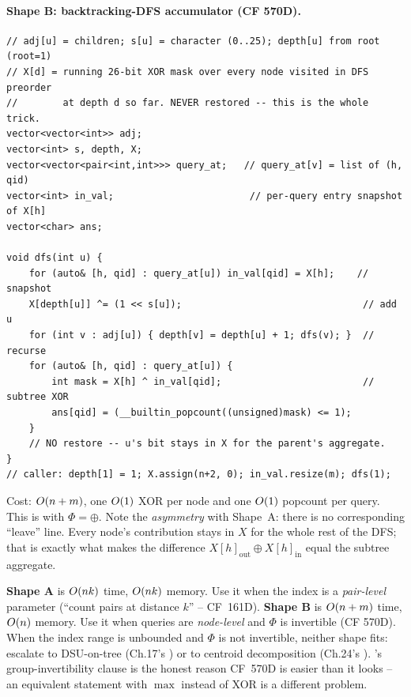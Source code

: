 \paragraph{Shape B: backtracking-DFS accumulator (CF 570D).}

\begin{lstlisting}[caption={Per-depth prefix XOR along the DFS preorder; each query takes an entry snapshot and reads the exit XOR-difference}, label={lst:c10-depth-hist}]
// adj[u] = children; s[u] = character (0..25); depth[u] from root (root=1)
// X[d] = running 26-bit XOR mask over every node visited in DFS preorder
//        at depth d so far. NEVER restored -- this is the whole trick.
vector<vector<int>> adj;
vector<int> s, depth, X;
vector<vector<pair<int,int>>> query_at;   // query_at[v] = list of (h, qid)
vector<int> in_val;                        // per-query entry snapshot of X[h]
vector<char> ans;

void dfs(int u) {
    for (auto& [h, qid] : query_at[u]) in_val[qid] = X[h];    // snapshot
    X[depth[u]] ^= (1 << s[u]);                                // add u
    for (int v : adj[u]) { depth[v] = depth[u] + 1; dfs(v); }  // recurse
    for (auto& [h, qid] : query_at[u]) {
        int mask = X[h] ^ in_val[qid];                         // subtree XOR
        ans[qid] = (__builtin_popcount((unsigned)mask) <= 1);
    }
    // NO restore -- u's bit stays in X for the parent's aggregate.
}
// caller: depth[1] = 1; X.assign(n+2, 0); in_val.resize(m); dfs(1);
\end{lstlisting}

\noindent Cost: $O(n + m)$, one $O(1)$ XOR per node and
one $O(1)$ popcount per query. This is  with
$\Phi=\oplus$. Note the \emph{asymmetry} with Shape~A: there is no
corresponding ``leave'' line. Every node's contribution stays in $\mathit{X}$
for the whole rest of the DFS; that is exactly what makes the difference
$\mathit{X}[h]_{\mathrm{out}} \oplus \mathit{X}[h]_{\mathrm{in}}$ equal the subtree aggregate.

\begin{complexitybox}
\textbf{Shape A} is $O(nk)$ time, $O(nk)$ memory. Use it when the
index is a \emph{pair-level} parameter (``count pairs at distance $k$''
-- CF~161D). \textbf{Shape B} is $O(n+m)$ time, $O(n)$ memory.
Use it when queries are \emph{node-level} and $\Phi$ is invertible (CF
570D). When the index range is unbounded and $\Phi$ is not invertible,
neither shape fits: escalate to DSU-on-tree (Ch.17's ) or to
centroid decomposition (Ch.24's ). 's
group-invertibility clause is the honest reason CF~570D is easier than
it looks -- an equivalent statement with $\max$ instead of XOR is a
different problem.
\end{complexitybox}

